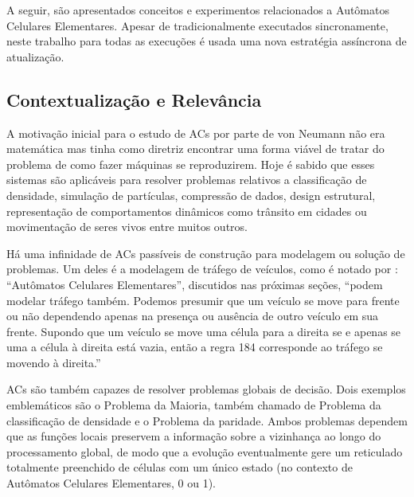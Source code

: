 \documentclass[a4paper,12pt]{ltxdoc}
\newcommand\tab[1][1cm]{\hspace*{#1}}
\begin{document}
\tab A seguir, são apresentados conceitos e experimentos relacionados a Autômatos Celulares Elementares. Apesar de tradicionalmente executados sincronamente, neste trabalho para todas as execuções é usada uma nova estratégia assíncrona de atualização.

\subsection{Contextualização e Relevância} \label{contex}

A motivação inicial para o estudo de ACs por parte de von Neumann não era matemática mas tinha como diretriz encontrar uma forma viável de tratar do problema de como fazer máquinas se reproduzirem. Hoje é sabido que esses sistemas são aplicáveis para resolver problemas relativos a classificação de densidade, simulação de partículas, compressão de dados, design estrutural, representação de comportamentos dinâmicos como trânsito em cidades ou movimentação de seres vivos entre muitos outros.

\tab Há uma infinidade de ACs passíveis de construção para modelagem ou solução de problemas. Um deles é a modelagem de tráfego de veículos, como é notado por \cite[p. 307]{rosenblueth2011model}:  ``Autômatos Celulares Elementares'', discutidos nas próximas seções, ``podem modelar tráfego também. Podemos presumir que um veículo se move para frente ou não dependendo apenas na presença ou ausência de outro veículo em sua frente. Supondo que um veículo se move uma célula para a direita se e apenas se uma a célula à direita está vazia, então a regra 184 corresponde ao tráfego se movendo à direita.''


\tab ACs são também capazes de resolver problemas globais de decisão. Dois exemplos emblemáticos são o Problema da Maioria, também chamado de Problema da classificação de densidade e o Problema da paridade. Ambos problemas dependem que as funções locais preservem a informação sobre a vizinhança ao longo do processamento global, de modo que a evolução eventualmente gere um reticulado totalmente preenchido de células com um único estado (no contexto de Autômatos Celulares Elementares, 0 ou 1).
\end{document}
